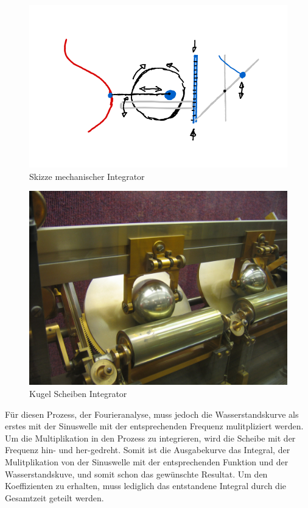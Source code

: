 \begin{figure}
	\centering
	\includegraphics[width=5\linewidth]{"papers/gezeiten/Skizze Integralmaschine"}
	\caption{Skizze mechanischer Integrator}
	\label{fig:skizze-integralmaschine}
\end{figure}
\begin{figure}
	\centering
	\includegraphics[width=5\linewidth]{papers/gezeiten/Harmonic_analyser_disc_and_sphere}
	\caption{Kugel Scheiben Integrator}
	\label{fig:harmonicanalyserdiscandsphere}
\end{figure}

Für diesen Prozess, der Fourieranalyse, muss jedoch die  Wasserstandskurve als erstes mit der Sinuswelle mit der entsprechenden Frequenz mulitpliziert werden.
Um die Multiplikation in den Prozess zu integrieren, wird die Scheibe mit der Frequenz hin- und her-gedreht.
Somit ist die Ausgabekurve das Integral, der Mulitplikation von der Sinuswelle mit der entsprechenden Funktion und der Wasserstandskuve, und somit schon das gewünschte Resultat.
Um den Koeffizienten zu erhalten, muss lediglich das entstandene Integral durch die Gesamtzeit geteilt werden.

